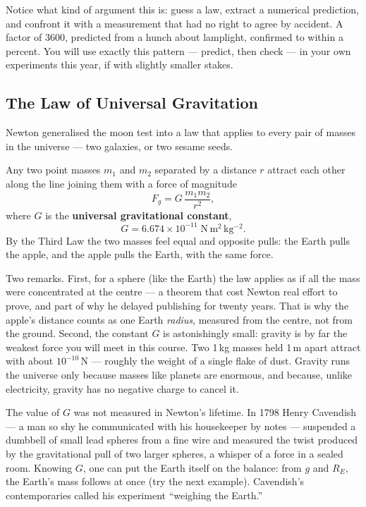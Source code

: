 Notice what kind of argument this is: guess a law, extract a numerical
prediction, and confront it with a measurement that had no right to agree by
accident. A factor of 3600, predicted from a hunch about lamplight, confirmed
to within a percent. You will use exactly this pattern --- predict, then
check --- in your own experiments this year, if with slightly smaller stakes.

\subsection{The Law of Universal Gravitation}

Newton generalised the moon test into a law that applies to every pair of
masses in the universe --- two galaxies, or two sesame seeds.

\begin{keybox}
Any two point masses $m_1$ and $m_2$ separated by a distance $r$ attract each
other along the line joining them with a force of magnitude
\begin{equation}
    F_g = G\,\frac{m_1 m_2}{r^2},
\end{equation}
where $G$ is the \textbf{universal gravitational constant},
\begin{equation*}
    G = 6.674\times10^{-11}\;\mathrm{N\,m^2\,kg^{-2}}.
\end{equation*}
By the Third Law the two masses feel equal and opposite pulls: the Earth
pulls the apple, and the apple pulls the Earth, with the same force.
\end{keybox}

Two remarks. First, for a sphere (like the Earth) the law applies as if all
the mass were concentrated at the centre --- a theorem that cost Newton real
effort to prove, and part of why he delayed publishing for twenty years.
That is why the apple's distance counts as one Earth \emph{radius}, measured
from the centre, not from the ground. Second, the constant $G$ is
astonishingly small: gravity is by far the weakest force you will meet in
this course. Two 1\,kg masses held 1\,m apart attract with about
$10^{-10}$\,N --- roughly the weight of a single flake of dust. Gravity runs
the universe only because masses like planets are enormous, and because,
unlike electricity, gravity has no negative charge to cancel it.

The value of $G$ was not measured in Newton's lifetime. In 1798 Henry
Cavendish --- a man so shy he communicated with his housekeeper by notes ---
suspended a dumbbell of small lead spheres from a fine wire and measured the
twist produced by the gravitational pull of two larger spheres, a whisper of
a force in a sealed room. Knowing $G$, one can put the Earth itself on the
balance: from $g$ and $R_E$, the Earth's mass follows at once (try the next
example). Cavendish's contemporaries called his experiment ``weighing the
Earth.''

